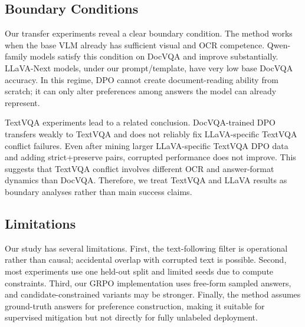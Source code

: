 \subsection{Boundary Conditions}

Our transfer experiments reveal a clear boundary condition.
The method works when the base VLM already has sufficient visual and OCR competence.
Qwen-family models satisfy this condition on DocVQA and improve substantially.
LLaVA-Next models, under our prompt/template, have very low base DocVQA accuracy.
In this regime, DPO cannot create document-reading ability from scratch; it can only alter preferences among answers the model can already represent.

TextVQA experiments lead to a related conclusion.
DocVQA-trained DPO transfers weakly to TextVQA and does not reliably fix LLaVA-specific TextVQA conflict failures.
Even after mining larger LLaVA-specific TextVQA DPO data and adding strict+preserve pairs, corrupted performance does not improve.
This suggests that TextVQA conflict involves different OCR and answer-format dynamics than DocVQA.
Therefore, we treat TextVQA and LLaVA results as boundary analyses rather than main success claims.

\subsection{Limitations}

Our study has several limitations.
First, the text-following filter is operational rather than causal; accidental overlap with corrupted text is possible.
Second, most experiments use one held-out split and limited seeds due to compute constraints.
Third, our GRPO implementation uses free-form sampled answers, and candidate-constrained variants may be stronger.
Finally, the method assumes ground-truth answers for preference construction, making it suitable for supervised mitigation but not directly for fully unlabeled deployment.

